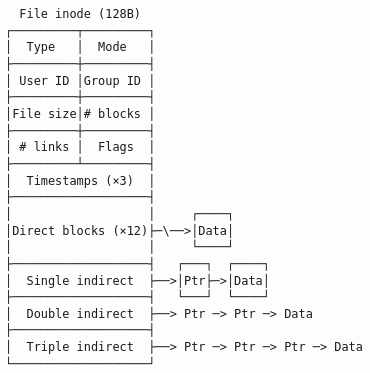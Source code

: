 \documentclass[varwidth,crop]{standalone}
\begin{document}
\begin{verbatim}
  File inode (128B)
┌─────────┬─────────┐
│  Type   │  Mode   │
├─────────┼─────────┤
│ User ID │Group ID │
├─────────┼─────────┤
│File size│# blocks │
├─────────┼─────────┤
│ # links │  Flags  │
├─────────┴─────────┤
│  Timestamps (×3)  │   
├───────────────────┤   
│                   │     ┌────┐
│Direct blocks (×12)├─\──>│Data│
│                   │     └────┘
├───────────────────┤   ┌───┐  ┌────┐
│  Single indirect  ├──>│Ptr├─>│Data│
├───────────────────┤   └───┘  └────┘
│  Double indirect  ├──> Ptr ─> Ptr ─> Data
├───────────────────┤ 
│  Triple indirect  ├──> Ptr ─> Ptr ─> Ptr ─> Data
└───────────────────┘ 
\end{verbatim}
\end{document}
